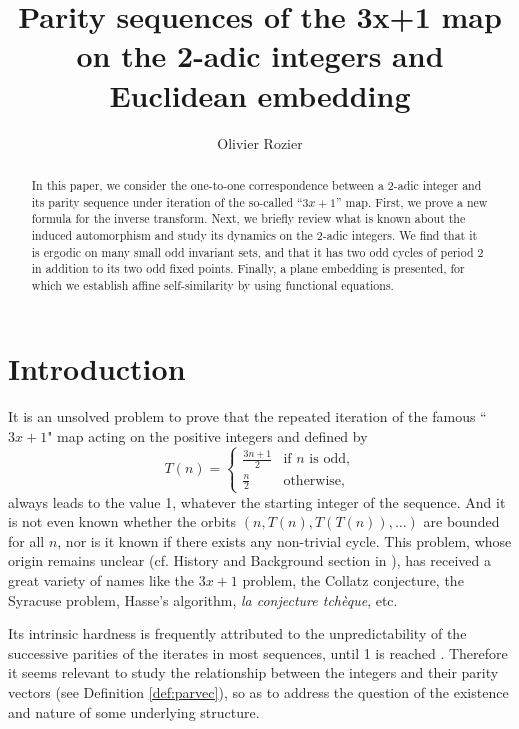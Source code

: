 \documentclass[12pt]{article}
\theoremstyle{definition}
\begin{document}
\title{Parity sequences of the 3x+1 map on the 2-adic integers and Euclidean embedding}
\author{Olivier Rozier}
\date{}

\maketitle

\begin{abstract}
In this paper, we consider the one-to-one correspondence between a 2-adic integer and its parity sequence under iteration of the so-called ``$3x+1$'' map. First, we prove a new formula for the inverse transform. Next, we briefly review what is known about the induced automorphism and study its dynamics on the 2-adic integers. We find that it is ergodic on many small odd invariant sets, and that it has two odd cycles of period 2 in addition to its two odd fixed points. Finally, a plane embedding is presented, for which we establish affine self-similarity by using functional equations.
\end{abstract}


\section{Introduction}

It is an unsolved problem \cite{Guy, Lag10} to prove that the repeated iteration of the famous ``$3x+1$" map acting on the positive integers and defined by 
\begin{equation}\label{eq:T}
T(n) = \left\{\begin{array}{ll}
  \frac{3n+1}{2} & \mbox{if $n$ is odd,} \\
  \frac{n}{2} & \mbox{otherwise,} 
\end{array}\right.
\end{equation}
always leads to the value 1, whatever the starting integer of the sequence. And it is not even known whether the orbits $\left( n, T(n), T\left( T(n)\right) , \ldots\right) $ are bounded for all $n$, nor is it known if there exists any non-trivial cycle. This problem, whose origin remains unclear (cf. History and Background section in \cite[p. 5]{Lag10}), has received a great variety of names like the $3x+1$ problem, the Collatz conjecture, the Syracuse problem, Hasse's algorithm, \textit{la conjecture tch\`eque}, etc.

Its intrinsic hardness is frequently attributed to the unpredictability of the successive parities of the iterates in most sequences, until 1 is reached \cite{Aki04,Cra78}. Therefore it seems relevant to study the relationship between the integers and their parity vectors (see Definition \ref{def:parvec}), so as to address the question of the existence and nature of some underlying structure. 
\end{document}
